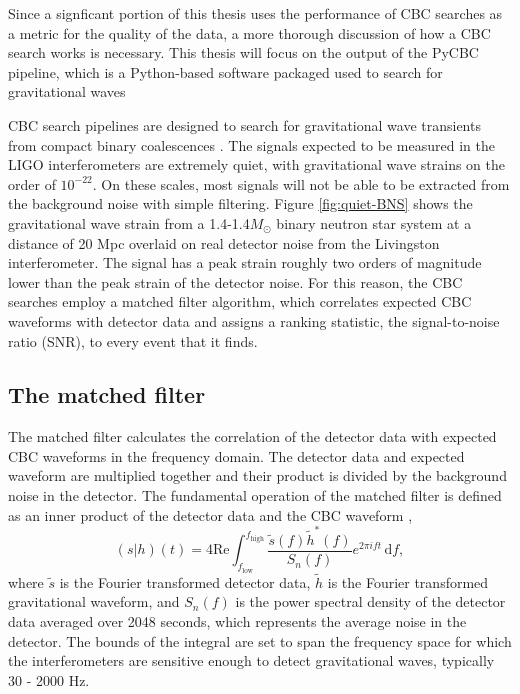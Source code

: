 Since a signficant portion of this thesis uses the performance of 
CBC searches as a metric for the quality of the 
data, a more thorough discussion of how a CBC search 
works is necessary. This thesis will focus on the output of the PyCBC 
pipeline, which is a Python-based software packaged used to search for 
gravitational waves \cite{Usman:2015kfa,pycbc-github}

CBC search pipelines are designed to search for gravitational wave transients 
from compact binary coalescences \cite{Usman:2015kfa}. 
The signals expected to be measured in the LIGO interferometers are extremely quiet, 
with gravitational wave strains on the order of $10^{-22}$. On these scales, most 
signals will not be able to be extracted from the background noise with simple filtering. 
Figure \ref{fig:quiet-BNS} shows the gravitational wave strain from a 1.4-1.4$M_{\odot}$ 
binary neutron star system at a distance of 20 Mpc overlaid on real detector noise from 
the Livingston 
interferometer. The signal has a peak strain roughly two orders of magnitude lower than 
the peak strain of the detector noise. 
For this reason, the CBC searches employ a matched filter algorithm, which correlates 
expected CBC
waveforms with detector data and assigns a ranking statistic, the signal-to-noise 
ratio (SNR), to every event that it finds. 

\subsection{The matched filter}

The matched filter calculates the correlation of the detector data with expected CBC 
waveforms in the frequency domain. The detector data and expected waveform are 
multiplied together and their product is divided by the background noise in the detector. 
The fundamental operation of the matched filter is defined as an inner product of the 
detector data and the CBC waveform \cite{Usman:2015kfa},
\begin{equation}
(s|h)(t) = 4\mathrm{Re}\int_{f_\mathrm{low}}^{f_\mathrm{high}} \frac{\tilde{s}(f)\tilde{h}^*(f)}{S_n (f)}e^{2\pi i f t}\, \mathrm{d}f,
\label{eq:inner-product}
\end{equation}
where $\tilde{s}$ is the Fourier transformed detector data, $\tilde{h}$ is the Fourier
transformed gravitational waveform, and $S_n (f)$ is the power spectral
density of the detector data averaged over 2048 seconds, which represents the average 
noise in the detector. The bounds of the integral are set to span the frequency space 
for which the interferometers are sensitive enough to detect gravitational waves, 
typically 30 - 2000 Hz. 

